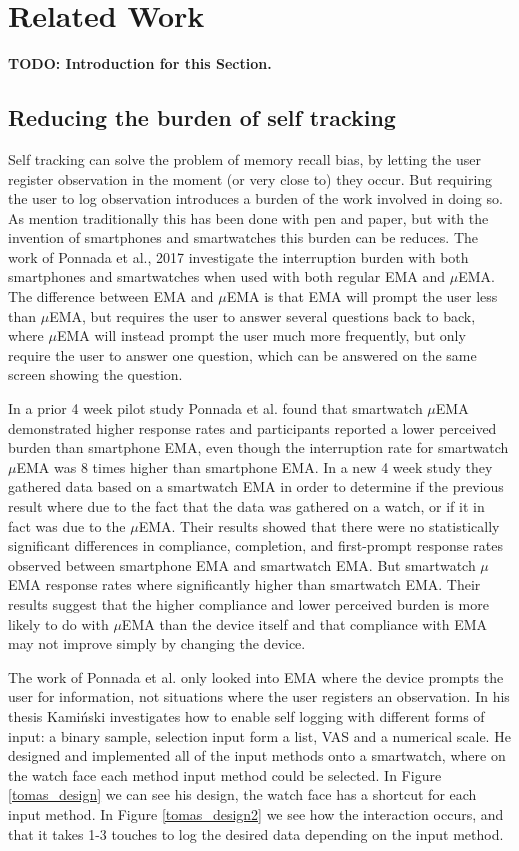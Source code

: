 \chapter{Related Work}\label{related_ch}

\textbf{TODO: Introduction for this Section.}

\section{Reducing the burden of self tracking}
Self tracking can solve the problem of memory recall bias, by letting the user register observation in the moment (or very close to) they occur. But requiring the user to log observation introduces a burden of the work involved in doing so. As mention traditionally this has been done with pen and paper, but with the invention of smartphones and smartwatches this burden can be reduces. The work of Ponnada et al., 2017\cite{compare} investigate the interruption burden with both smartphones and smartwatches when used with both regular EMA and $\mu$EMA. The difference between EMA and $\mu$EMA is that EMA will prompt the user less than $\mu$EMA, but requires the user to answer several questions back to back, where $\mu$EMA will instead prompt the user much more frequently, but only require the user to answer one question, which can be answered on the same screen showing the question. 

In a prior 4 week pilot study Ponnada et al.\cite{compare} found that smartwatch $\mu$EMA demonstrated higher response rates and participants reported a lower perceived burden than smartphone EMA, even though the interruption rate for smartwatch $\mu$EMA was 8 times higher than smartphone EMA. In a new 4 week study they gathered data based on a smartwatch EMA in order to determine if the previous result where due to the fact that the data was gathered on a watch, or if it in fact was due to the $\mu$EMA. Their results showed that there were no statistically significant differences in compliance, completion, and first-prompt response rates observed between smartphone EMA and smartwatch EMA. But smartwatch $\mu$EMA response rates where significantly higher than smartwatch EMA. Their results suggest that the higher compliance and lower perceived burden is more likely to do with $\mu$EMA than the device itself and that compliance with EMA may not improve simply by changing the device.

The work of Ponnada et al. only looked into EMA where the device prompts the user for information, not situations where the user registers an observation. In his thesis Kami\'nski\cite{tomas} investigates how to enable self logging with different forms of input: a binary sample, selection input form a list, VAS and a numerical scale. He designed and implemented all of the input methods onto a smartwatch, where on the watch face each method input method could be selected. In Figure \ref{tomas_design} we can see his design, the watch face has a shortcut for each input method. In Figure \ref{tomas_design2} we see how the interaction occurs, and that it takes 1-3 touches to log the desired data depending on the input method.

